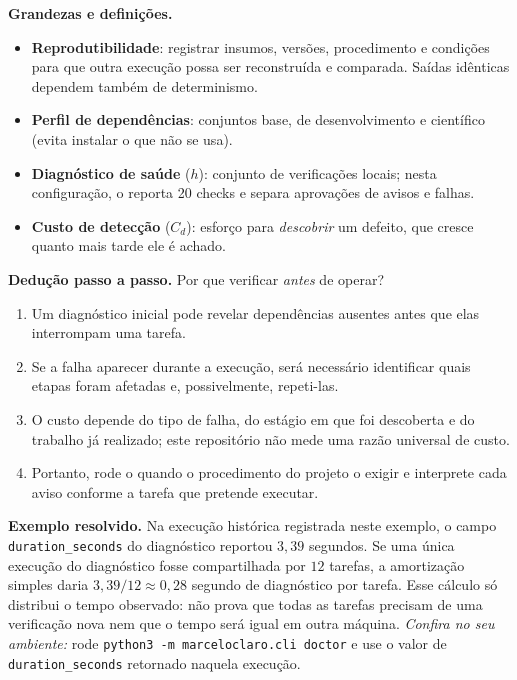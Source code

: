 \begin{definicao}
\textbf{Grandezas e definições.}
\begin{itemize}[leftmargin=1.3em,itemsep=1pt]
  \item \textbf{Reprodutibilidade}: registrar insumos, versões, procedimento e condições para que outra execução possa ser reconstruída e comparada. Saídas idênticas dependem também de determinismo.
  \item \textbf{Perfil de dependências}: conjuntos base, de desenvolvimento e científico (evita instalar o que não se usa).
  \item \textbf{Diagnóstico de saúde} ($h$): conjunto de verificações locais; nesta configuração, o  reporta 20 checks e separa aprovações de avisos e falhas.
  \item \textbf{Custo de detecção} ($C_d$): esforço para \emph{descobrir} um defeito, que cresce quanto mais tarde ele é achado.
\end{itemize}
\end{definicao}

\begin{metodo}
\textbf{Dedução passo a passo.} Por que verificar \emph{antes} de operar?
\begin{enumerate}[leftmargin=1.4em,itemsep=2pt]
  \item Um diagnóstico inicial pode revelar dependências ausentes antes que elas interrompam uma tarefa.
  \item Se a falha aparecer durante a execução, será necessário identificar quais etapas foram afetadas e, possivelmente, repeti-las.
  \item O custo depende do tipo de falha, do estágio em que foi descoberta e do trabalho já realizado; este repositório não mede uma razão universal de custo.
  \item Portanto, rode o  quando o procedimento do projeto o exigir e interprete cada aviso conforme a tarefa que pretende executar.
\end{enumerate}
\end{metodo}

\begin{resultado}
\textbf{Exemplo resolvido.} Na execução histórica registrada neste exemplo, o campo
\texttt{duration\_seconds} do diagnóstico reportou $3{,}39$ segundos. Se uma única execução do
diagnóstico fosse compartilhada por $12$ tarefas, a amortização simples daria
$3{,}39/12 \approx 0{,}28$ segundo de diagnóstico por tarefa. Esse cálculo só
distribui o tempo observado: não prova que todas as tarefas precisam de uma
verificação nova nem que o tempo será igual em outra máquina. \emph{Confira no seu
ambiente:} rode \texttt{python3\ -m\ marceloclaro.cli\ doctor} e use o valor de
\texttt{duration\_seconds} retornado naquela execução.
\end{resultado}

